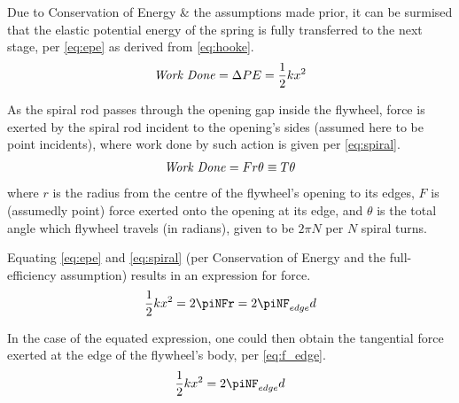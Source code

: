 \documentclass[conference]{IEEEtran}
\begin{document}
Due to Conservation of Energy \& the assumptions made prior, it can be surmised that the elastic potential energy of the spring is fully transferred to the next stage, per \eqref{eq:epe} as derived from \eqref{eq:hooke}.
\begin{equation}
    \label{eq:epe}
    \text{\textit{Work Done}} = \Delta PE = \frac{1}{2}kx^2
\end{equation}

As the spiral rod passes through the opening gap inside the flywheel, force is exerted by the spiral rod incident to the opening's sides (assumed here to be point incidents), where work done by such action is given per \eqref{eq:spiral}.
\begin{equation}
    \label{eq:spiral}
    \text{\textit{Work Done}} = Fr\theta \equiv T\theta
\end{equation}
where \(r\) is the radius from the centre of the flywheel's opening to its edges, \(F\) is (assumedly point) force exerted onto the opening at its edge, and \(\theta\) is the total angle which flywheel travels (in radians), given to be \(2\pi N\) per \(N\) spiral turns.

Equating \eqref{eq:epe} and \eqref{eq:spiral} (per Conservation of Energy and the full-efficiency assumption) results in an expression for force.
\begin{displaymath}
    \frac{1}{2}kx^2 = 2\piNFr = 2\piNF_{edge}d
\end{displaymath}

In the case of the equated expression, one could then obtain the tangential force exerted at the edge of the flywheel's body, per \eqref{eq:f_edge}.
\begin{equation}
    \label{eq:f_edge}
    \frac{1}{2}kx^2 = 2\piNF_{edge}d
\end{equation}







\medskip


\end{document}
